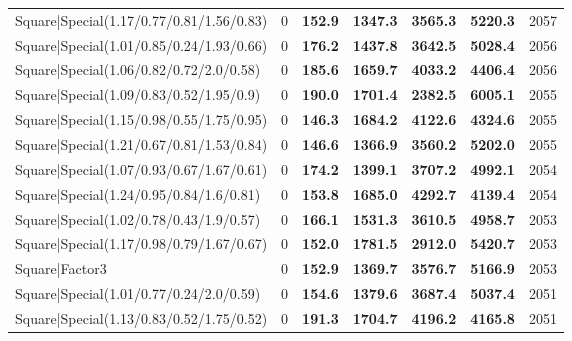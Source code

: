 \begin{tabular}{lrllllr}
 Square|Special(1.17/0.77/0.81/1.56/0.83)                      &             0   & \textbf{152.9} & \textbf{1347.3} & \textbf{3565.3} & \textbf{5220.3} &         2057 \\
 Square|Special(1.01/0.85/0.24/1.93/0.66)                      &             0   & \textbf{176.2} & \textbf{1437.8} & \textbf{3642.5} & \textbf{5028.4} &         2056 \\
 Square|Special(1.06/0.82/0.72/2.0/0.58)                       &             0   & \textbf{185.6} & \textbf{1659.7} & \textbf{4033.2} & \textbf{4406.4} &         2056 \\
 Square|Special(1.09/0.83/0.52/1.95/0.9)                       &             0   & \textbf{190.0} & \textbf{1701.4} & \textbf{2382.5} & \textbf{6005.1} &         2055 \\
 Square|Special(1.15/0.98/0.55/1.75/0.95)                      &             0   & \textbf{146.3} & \textbf{1684.2} & \textbf{4122.6} & \textbf{4324.6} &         2055 \\
 Square|Special(1.21/0.67/0.81/1.53/0.84)                      &             0   & \textbf{146.6} & \textbf{1366.9} & \textbf{3560.2} & \textbf{5202.0} &         2055 \\
 Square|Special(1.07/0.93/0.67/1.67/0.61)                      &             0   & \textbf{174.2} & \textbf{1399.1} & \textbf{3707.2} & \textbf{4992.1} &         2054 \\
 Square|Special(1.24/0.95/0.84/1.6/0.81)                       &             0   & \textbf{153.8} & \textbf{1685.0} & \textbf{4292.7} & \textbf{4139.4} &         2054 \\
 Square|Special(1.02/0.78/0.43/1.9/0.57)                       &             0   & \textbf{166.1} & \textbf{1531.3} & \textbf{3610.5} & \textbf{4958.7} &         2053 \\
 Square|Special(1.17/0.98/0.79/1.67/0.67)                      &             0   & \textbf{152.0} & \textbf{1781.5} & \textbf{2912.0} & \textbf{5420.7} &         2053 \\
 Square|Factor3                                                &             0   & \textbf{152.9} & \textbf{1369.7} & \textbf{3576.7} & \textbf{5166.9} &         2053 \\
 Square|Special(1.01/0.77/0.24/2.0/0.59)                       &             0   & \textbf{154.6} & \textbf{1379.6} & \textbf{3687.4} & \textbf{5037.4} &         2051 \\
 Square|Special(1.13/0.83/0.52/1.75/0.52)                      &             0   & \textbf{191.3} & \textbf{1704.7} & \textbf{4196.2} & \textbf{4165.8} &         2051 \\

\end{tabular}
